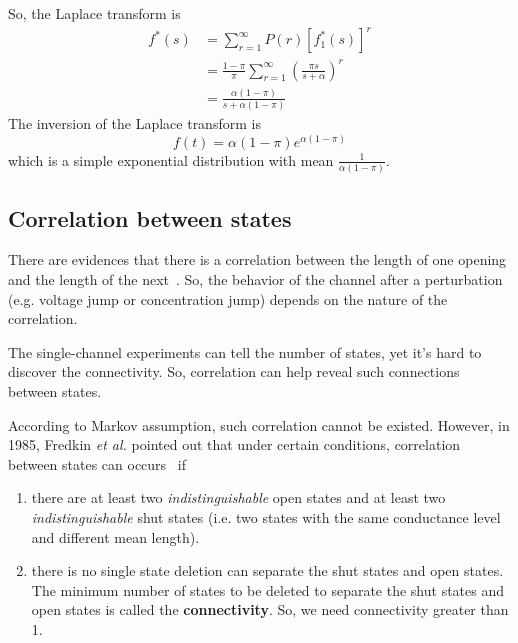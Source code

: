 So, the Laplace transform is
\begin{equation}
  \label{eq:921}
  \begin{split}
    f^*(s) &= \sum_{r=1}^\infty P(r)[f_1^*(s)]^r \\
    &= \frac{1-\pi}{\pi} \sum_{r=1}^\infty \left(\frac{\pi
        s}{s+\alpha}\right)^r \\
    &= \frac{\alpha(1-\pi)}{s+\alpha(1-\pi)}
  \end{split}
\end{equation}
The inversion of the Laplace transform is
\begin{equation}
  \label{eq:925}
  f(t) = \alpha(1-\pi)e^{\alpha(1-\pi)}
\end{equation}
which is a simple exponential distribution with mean
$\frac{1}{\alpha(1-\pi)}$.


\subsection{Correlation between states}
\label{sec:corr-betw-stat}

There are evidences that there is a correlation between the length of
one opening and the length of the next~\citep{fredkin1985iam}. So, the
behavior of the channel after a perturbation (e.g. voltage jump or
concentration jump) depends on the nature of the correlation.

\begin{framed}
  The single-channel experiments can tell the number of states, yet it's
  hard to discover the connectivity. So, correlation can help reveal
  such connections between states.
\end{framed}

According to Markov assumption, such correlation cannot be
existed. However, in 1985, Fredkin {\it et al.} pointed out that under
certain conditions, correlation between states can
occurs~\citep{fredkin1985iam} if
\begin{enumerate}
\item there are at least two {\it indistinguishable} open states and
  at least two {\it indistinguishable} shut states (i.e. two states
  with the same conductance level and different mean length).

\item there is no single state deletion can separate the shut states
  and open states. The minimum number of states to be deleted to
  separate the shut states and open states is called the {\bf
    connectivity}. So, we need connectivity greater than 1.
\end{enumerate}


